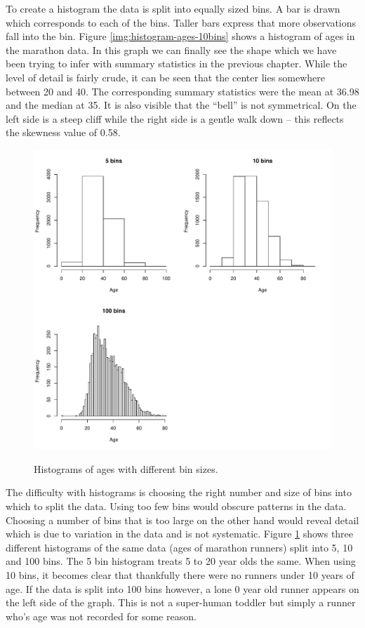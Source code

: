\documentclass{tufte-book} %
\begin{document}
To create a histogram the data is split into equally sized bins. A bar is drawn which corresponds to each of the bins. Taller bars express that more observations fall into the bin. Figure \ref{img:histogram-ages-10bins} shows a histogram of ages in the marathon data. In this graph we can finally see the shape which we have been trying to infer with summary statistics in the previous chapter. While the level of detail is fairly crude, it can be seen that the center lies somewhere between 20 and 40. The corresponding summary statistics were the mean at 36.98 and the median at 35. It is also visible that the ``bell'' is not symmetrical. On the left side is a steep cliff while the right side is a gentle walk down -- this reflects the skewness value of 0.58.

\begin{figure}
	\centering
	\includegraphics{graphics/histogram-ages-allbins}
	\label{img:histogram-ages-allbins}
	\caption{Histograms of ages with different bin sizes.}
\end{figure}

The difficulty with histograms is choosing the right number and size of bins into which to split the data. Using too few bins would obscure patterns in the data. Choosing a number of bins that is too large on the other hand would reveal detail which is due to variation in the data and is not systematic. Figure \ref{img:histogram-ages-allbins} shows three different histograms of the same data (ages of marathon runners) split into 5, 10 and 100 bins. The 5 bin histogram treats 5 to 20 year olds the same. When using 10 bins, it becomes clear that thankfully there were no runners under 10 years of age. If the data is split into 100 bins however, a lone 0 year old runner appears on the left side of the graph. This is not a super-human toddler but simply a runner who's age was not recorded for some reason.
\end{document}
